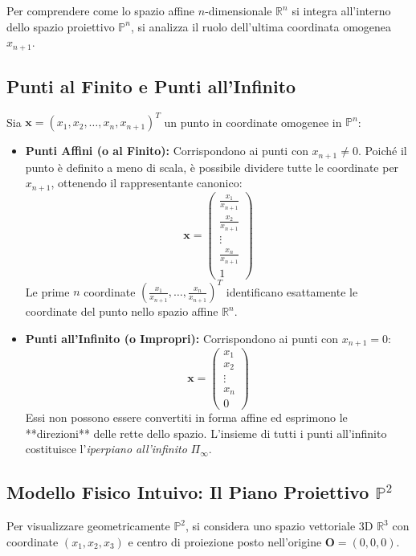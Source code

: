 Per comprendere come lo spazio affine $n$-dimensionale $\mathbb{R}^n$ si integra all'interno dello spazio proiettivo $\mathbb{P}^n$, si analizza il ruolo dell'ultima coordinata omogenea $x_{n+1}$.

\subsection{Punti al Finito e Punti all'Infinito}
Sia $\mathbf{x} = (x_1, x_2, \dots, x_n, x_{n+1})^T$ un punto in coordinate omogenee in $\mathbb{P}^n$:

\begin{itemize}
    \item \textbf{Punti Affini (o al Finito):} Corrispondono ai punti con $x_{n+1} \neq 0$. Poiché il punto è definito a meno di scala, è possibile dividere tutte le coordinate per $x_{n+1}$, ottenendo il rappresentante canonico:
    \begin{equation}
        \mathbf{x} = \begin{pmatrix} \frac{x_1}{x_{n+1}} \\ \frac{x_2}{x_{n+1}} \\ \vdots \\ \frac{x_n}{x_{n+1}} \\ 1 \end{pmatrix}
    \end{equation}
    Le prime $n$ coordinate $(\frac{x_1}{x_{n+1}}, \dots, \frac{x_n}{x_{n+1}})^T$ identificano esattamente le coordinate del punto nello spazio affine $\mathbb{R}^n$.
    
    \item \textbf{Punti all'Infinito (o Impropri):} Corrispondono ai punti con $x_{n+1} = 0$:
    \begin{equation}
        \mathbf{x} = \begin{pmatrix} x_1 \\ x_2 \\ \vdots \\ x_n \\ 0 \end{pmatrix}
    \end{equation}
    Essi non possono essere convertiti in forma affine ed esprimono le **direzioni** delle rette dello spazio. L'insieme di tutti i punti all'infinito costituisce l'\emph{iperpiano all'infinito} $\Pi_\infty$.
\end{itemize}

\subsection{Modello Fisico Intuivo: Il Piano Proiettivo $\mathbb{P}^2$}
Per visualizzare geometricamente $\mathbb{P}^2$, si considera uno spazio vettoriale 3D $\mathbb{R}^3$ con coordinate $(x_1, x_2, x_3)$ e centro di proiezione posto nell'origine $\mathbf{O}=(0,0,0)$.


